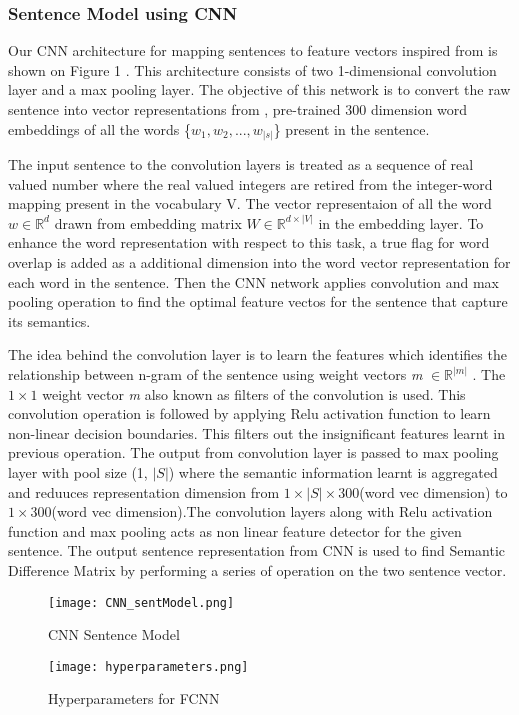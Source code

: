 \documentclass[12pt]{article} %
\begin{document}
	\subsubsection*{Sentence Model using CNN}
	Our CNN architecture for mapping sentences to feature
	vectors inspired from \cite{shao2017hcti} is shown on Figure 1 . This architecture consists of two 1-dimensional convolution layer and a max pooling layer. The objective of this network is to convert the raw sentence into vector representations from \cite{glove}, pre-trained 300 dimension word embeddings of all the words \{$w_{1}, w_{2},...,w_{|s|}$\} present in the sentence.
	
	The input sentence to the convolution layers is treated as a sequence of real valued number where the real valued integers are retired from the integer-word mapping present in the vocabulary V. The vector representaion of all the word $ w \in \mathbb{R}^{d}  $ drawn from embedding matrix  $ W \in \mathbb{R}^{d \times |V|} $ in the embedding layer. To enhance the word representation with respect to this task, a true flag for word overlap is added as a additional dimension into the word vector representation for each word in the sentence. Then the CNN network applies convolution and max pooling operation to find the optimal feature vectos for the sentence that capture its semantics. 
	
	The idea behind the convolution layer is to learn the features which identifies the relationship between n-gram of the sentence using weight vectors \textit{m} $\in \mathbb{R}^{|m|}$ . The $1 \times 1$ weight vector \textit{m} also known as filters of the convolution is used. This convolution operation is followed by applying Relu activation function to learn non-linear decision boundaries. This filters out the insignificant features learnt in previous operation. The output from convolution layer is passed to max pooling layer with pool size (1, $|S|$) where the semantic information learnt is aggregated and reduuces representation dimension from $1 \times |S| \times 300$(word vec dimension) to $1 \times 300$(word vec dimension).The convolution layers along with Relu activation function and max pooling acts as non linear  feature detector for the given sentence. The output sentence representation from CNN is used to find Semantic Difference Matrix by performing a series of operation on the two sentence vector. 
	
	\begin{figure}[!tbp]
		\centering
		\begin{minipage}[b]{0.43\textwidth}
		\centering
		\label{CNN_1}
		\texttt{[image: CNN\_sentModel.png]}
		\caption{CNN Sentence Model \cite{severyn2015learning}}
		\end{minipage}
		\hfill
		\begin{minipage}[b]{0.3\textwidth}
		\centering
		\label{params}
		\texttt{[image: hyperparameters.png]}
		\caption{Hyperparameters for FCNN \cite{shao2017hcti}}
		\end{minipage}
	\end{figure}
	
\end{document}
